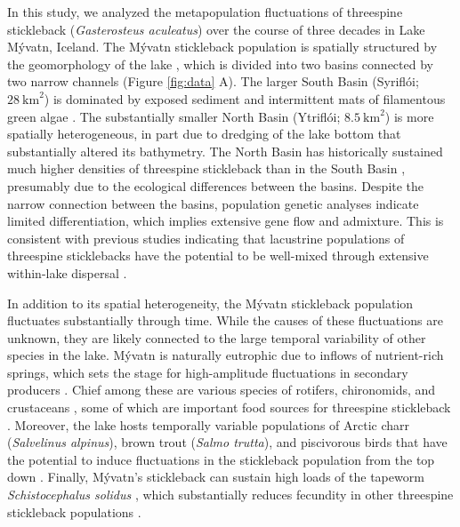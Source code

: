 \documentclass[11pt]{article}
\begin{document}
In this study, 
we analyzed the metapopulation fluctuations of threespine stickleback 
(\textit{Gasterosteus aculeatus})
over the course of three decades in Lake M\'{y}vatn, Iceland.
The M\'{y}vatn stickleback population is spatially structured by the geomorphology
of the lake \citep{gislason1998, millet2013}, 
which is divided into two basins connected by two narrow channels 
(Figure \ref{fig:data} A).
The larger South Basin (Sy{\dh}rifl\'{o}i; $28~\textrm{km}^2$)  
is dominated by exposed sediment and intermittent mats of filamentous green algae
\citep{einarsson2004myvatn}.
The substantially smaller North Basin (Ytrifl\'{o}i; $8.5~\textrm{km}^2$) 
is more spatially heterogeneous, 
in part due to dredging of the lake bottom
that substantially altered its bathymetry.
The North Basin has historically sustained much higher
densities of threespine stickleback than in the South Basin \citep{gislason1998}, 
presumably due to the ecological differences between the basins. 
Despite the narrow connection between the basins, 
population genetic \citep{millet2013} 
analyses indicate limited differentiation,
which implies extensive gene flow and admixture.
This is consistent with previous studies indicating that lacustrine populations
of threespine sticklebacks have the potential to be  
well-mixed through extensive within-lake dispersal
\citep{bolnick2009phenotype}.

In addition to its spatial heterogeneity,
the M\'{y}vatn stickleback population fluctuates substantially through time.
While the causes of these fluctuations are unknown, 
they are likely connected to the large temporal variability 
of other species in the lake.
M\'{y}vatn is naturally eutrophic due to inflows of nutrient-rich springs,
which sets the stage for high-amplitude fluctuations in secondary producers
\citep{einarsson2004myvatn}.
Chief among these are various species of rotifers, chironomids, and crustaceans
\citep{einarsson2002, einarsson2004clad, gardarsson2004population, ives2008},
some of which are important food sources for threespine stickleback
\citep{gudmundsson1996}.
Moreover, the lake hosts temporally variable populations 
of Arctic charr (\textit{Salvelinus alpinus}), 
brown trout (\textit{Salmo trutta}), 
and piscivorous birds that have the potential 
to induce fluctuations in the stickleback population from the top down
\citep{gardarsson1979waterfowl, gudbergsson2004, phillips2022}.
Finally, M\'{y}vatn's stickleback can sustain high loads of the tapeworm
\textit{Schistocephalus solidus} \citep{gislason1998, karvonen2013},
which substantially reduces fecundity in other threespine stickleback populations 
\citep{heins2010evolutionary, heins2012fecundity}.
\end{document}
